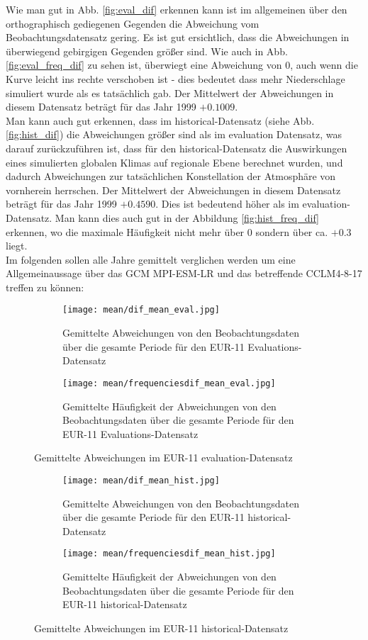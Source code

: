 \vfill
Wie man gut in Abb. \ref{fig:eval_dif} erkennen kann ist im allgemeinen über den orthographisch gediegenen Gegenden die Abweichung vom Beobachtungsdatensatz gering. Es ist gut ersichtlich, dass die Abweichungen in überwiegend gebirgigen Gegenden größer sind. Wie auch in Abb. \ref{fig:eval_freq_dif} zu sehen ist, überwiegt eine Abweichung von 0, auch wenn die Kurve leicht ins rechte verschoben ist - dies bedeutet dass mehr Niederschlage simuliert wurde als es tatsächlich gab. Der Mittelwert der Abweichungen in diesem Datensatz beträgt für das Jahr 1999 $+0.1009$.\\
Man kann auch gut erkennen, dass im historical-Datensatz (siehe Abb. \ref{fig:hist_dif}) die Abweichungen größer sind als im evaluation Datensatz, was darauf zurückzuführen ist, dass für den historical-Datensatz die Auswirkungen eines simulierten globalen Klimas auf regionale Ebene berechnet wurden, und dadurch Abweichungen zur tatsächlichen Konstellation der Atmosphäre von vornherein herrschen. Der Mittelwert der Abweichungen in diesem Datensatz beträgt für das Jahr 1999 $+0.4590$. Dies ist bedeutend höher als im evaluation-Datensatz. Man kann dies auch gut in der Abbildung \ref{fig:hist_freq_dif} erkennen, wo die maximale Häufigkeit nicht mehr über $0$ sondern über ca. $+0.3$ liegt.\\
Im folgenden sollen alle Jahre gemittelt verglichen werden um eine Allgemeinaussage über das GCM MPI-ESM-LR und das betreffende CCLM4-8-17 treffen zu können:
\begin{figure}[h]
	\begin{subfigure}[h]{0.49\textwidth}
	\centering
	\texttt{[image: mean/dif\_mean\_eval.jpg]}
	\caption{Gemittelte Abweichungen von den Beobachtungsdaten über die gesamte Periode für den EUR-11 Evaluations-Datensatz}
	\label{fig:mean_dif_eval}
	\end{subfigure}
	\begin{subfigure}[h]{0.49\textwidth}
		\centering
		\texttt{[image: mean/frequenciesdif\_mean\_eval.jpg]}
		\caption{Gemittelte Häufigkeit der Abweichungen von den Beobachtungsdaten über die gesamte Periode für den EUR-11 Evaluations-Datensatz}
		\label{fig:freq_mean_dif_eval}
	\end{subfigure}
	\caption{Gemittelte Abweichungen im EUR-11 evaluation-Datensatz}
\end{figure}
\begin{figure}[h]
	\begin{subfigure}[h]{0.49\textwidth}
	\centering
	\texttt{[image: mean/dif\_mean\_hist.jpg]}
	\caption{Gemittelte Abweichungen von den Beobachtungsdaten über die gesamte Periode für den EUR-11 historical-Datensatz}
	\label{fig:mean_dif_hist}
	\end{subfigure}
	\begin{subfigure}[h]{0.49\textwidth}
			\centering
		\texttt{[image: mean/frequenciesdif\_mean\_hist.jpg]}
		\caption{Gemittelte Häufigkeit der Abweichungen von den Beobachtungsdaten über die gesamte Periode für den EUR-11  historical-Datensatz}
		\label{fig:freq_mean_dif_hist}
	\end{subfigure}
	\caption{Gemittelte Abweichungen im EUR-11 historical-Datensatz}
\end{figure}
